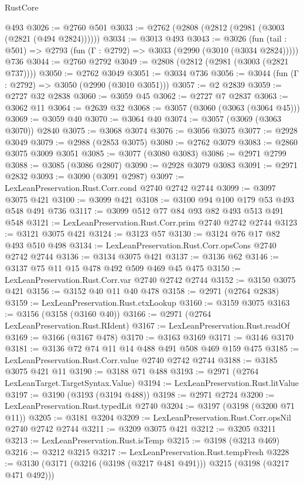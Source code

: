 \begin{lexlean}{RustCore}
\begin{coremodule}
    @493
@3026 := @2760 @501
@3033 := @2762 (@2808 (@2812 (@2981 (@3003 (@2821 (@494 @2824))))))
@3034 := @3013 @493
@3043 := @3026
    (fun (tail : @501) => @2793 (fun (Γ : @2792) => @3033 (@2990 (@3010 (@3034 @2824)))))
    @736
@3044 := @2760 @2792
@3049 := @2808 (@2812 (@2981 (@3003 (@2821 @737))))
@3050 := @2762 @3049
@3051 := @3034 @736
@3056 := @3044 (fun (Γ : @2792) => @3050 (@2990 (@3010 @3051)))
@3057 := @2 @2839
@3059 := @2727 @32 @2838
@3060 := @3059 @45
@3062 := @2727 @7 @2837
@3063 := @3062 @11
@3064 := @2639 @32
@3068 := @3057 (@3060 (@3063 (@3064 @45)))
@3069 := @3059 @40
@3070 := @3064 @40
@3074 := @3057 (@3069 (@3063 @3070)) @2840
@3075 := @3068 @3074
@3076 := @3056 @3075
@3077 := @2928 @3049
@3079 := @2988 (@2853 @3075)
@3080 := @2762 @3079
@3083 := @2860 @3075 @3009 @3051
@3085 := @3077 (@3080 @3083)
@3086 := @2971 @2799
@3088 := @3085 (@3086 @2807)
@3090 := @2928 @3079 @3083
@3091 := @2971 @2832
@3093 := @3090 (@3091 @2987)
@3097 := LexLeanPreservation.Rust.Corr.cond @2740 @2742 @2744
@3099 := @3097 @3075 @421
@3100 := @3099 @421
@3108 := @3100 @94 @100 @179 @53 @493 @548 @491 @736
@3117 := @3099 @512 @77 @84 @93 @82 @493 @513 @491 @548
@3121 := LexLeanPreservation.Rust.Corr.prim @2740 @2742 @2744
@3123 := @3121 @3075 @421
@3124 := @3123 @57
@3130 := @3124 @76 @17 @82 @493 @510 @498
@3134 := LexLeanPreservation.Rust.Corr.opsCons @2740 @2742 @2744
@3136 := @3134 @3075 @421
@3137 := @3136 @62
@3146 := @3137 @75 @11 @15 @478 @492 @509 @469 @45 @475
@3150 := LexLeanPreservation.Rust.Corr.var @2740 @2742 @2744
@3152 := @3150 @3075 @421
@3156 := @3152 @40 @11 @40 @478
@3158 := @2971 (@2764 @2838)
@3159 := LexLeanPreservation.Rust.ctxLookup
@3160 := @3159 @3075
@3163 := @3156 (@3158 (@3160 @40))
@3166 := @2971 (@2764 LexLeanPreservation.Rust.RIdent)
@3167 := LexLeanPreservation.Rust.readOf
@3169 := @3166 (@3167 @478)
@3170 := @3163 @3169
@3171 := @3146 @3170
@3181 := @3136 @72 @74 @11 @14 @488 @491 @508 @469 @159 @475
@3185 := LexLeanPreservation.Rust.Corr.value @2740 @2742 @2744
@3188 := @3185 @3075 @421 @11
@3190 := @3188 @71 @488
@3193 := @2971 (@2764 LexLeanTarget.TargetSyntax.Value)
@3194 := LexLeanPreservation.Rust.litValue
@3197 := @3190 (@3193 (@3194 @488))
@3198 := @2971 @2724
@3200 := LexLeanPreservation.Rust.typedLit @2740
@3204 := @3197 (@3198 (@3200 @71 @11))
@3205 := @3181 @3204
@3209 := LexLeanPreservation.Rust.Corr.opsNil @2740 @2742 @2744
@3211 := @3209 @3075 @421
@3212 := @3205 @3211
@3213 := LexLeanPreservation.Rust.isTemp
@3215 := @3198 (@3213 @469)
@3216 := @3212 @3215
@3217 := LexLeanPreservation.Rust.tempFresh
@3228 := @3130 (@3171 (@3216 (@3198 (@3217 @481 @491))) @3215 (@3198 (@3217 @471 @492)))

\end{coremodule}
\end{lexlean}
